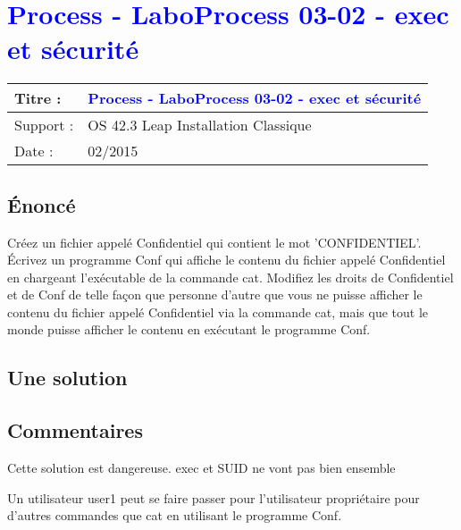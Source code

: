 \lstset{language=c}
\renewcommand{\titre}{\textcolor{blue}{ Process - LaboProcess 03-02 - exec et sécurité }}

\lhead{ \titre }
\section{{\titre} }

\begin{tabular}{|l|l|}
\hline
Titre : 	& \titre \\\hline
Support : 	& OS 42.3 Leap Installation Classique \\\hline
Date :		& 02/2015 \\\hline
\end{tabular}

\subsection{Énoncé}

Créez un fichier appelé Confidentiel qui contient le mot 'CONFIDENTIEL'. 
Écrivez un programme Conf qui affiche le contenu du fichier appelé Confidentiel en chargeant l'exécutable de la commande cat. 
Modifiez les droits de Confidentiel et de Conf de telle façon que personne d'autre que vous ne puisse afficher le contenu du fichier appelé Confidentiel via la commande cat, mais que tout le monde puisse afficher le contenu en exécutant le programme Conf.

\subsection{Une solution}



\subsection{Commentaires}

\begin{list}{.}{}
\item Cette solution est dangereuse. exec et SUID ne vont pas bien ensemble
\item Un utilisateur user1 peut se faire passer pour l'utilisateur propriétaire pour d'autres commandes que cat en utilisant le programme Conf.
\end{list}
\newpage
